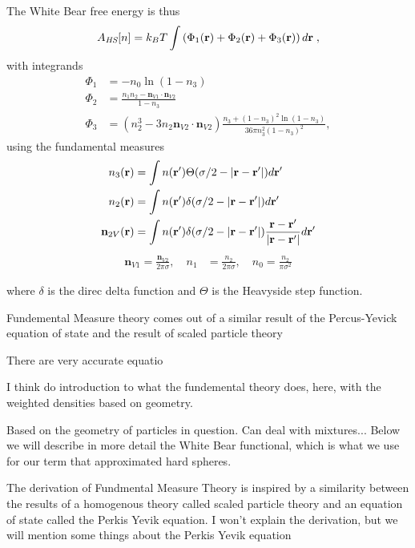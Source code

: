 The White Bear free
energy is thus
\begin{equation}
A_\textit{HS}[n] = k_B T \int \left(\Phi_1(\textbf{r}) + \Phi_2(\textbf{r}) + \Phi_3(\textbf{r})\right) d\textbf{r} \; ,
\end{equation}
with integrands
\begin{align}
\Phi_1 &= -n_0 \ln\left( 1 - n_3\right) \label{eq:Phi1}\\
\Phi_2 &= \frac{n_1 n_2 - \mathbf{n}_{V1} \cdot\mathbf{n}_{V2}}{1-n_3} \\
\Phi_3 &= (n_2^3 - 3 n_2 \mathbf{n}_{V2} \cdot \mathbf{n}_{V2}) \frac{
  n_3 + (1-n_3)^2 \ln(1-n_3)
}{
  36\pi n_3^2\left( 1 - n_3 \right)^2
} , \label{eq:Phi3}
\end{align}
using the fundamental measures
\begin{align}
  n_3(\textbf{r}) &= \int n(\textbf{r}') \Theta(\sigma/2 -\left|\textbf{r} - \textbf{r}'\right|)
  d\textbf{r}' \label{eq:FMn3} \\
  n_2(\textbf{r}) &= \int n(\textbf{r}') \delta(\sigma/2 -\left|\textbf{r} - \textbf{r}'\right|) d\textbf{r}' \\
  \mathbf{n}_{2V}(\textbf{r}) &= \int n(\textbf{r}') \delta(\sigma/2 -\left|\textbf{r} - \textbf{r}'\right|) \frac{\textbf{r}-\textbf{r}'}{|\textbf{r}-\textbf{r}'|}d\textbf{r}'
\end{align}
\begin{align}
  \mathbf{n}_{V1} = \frac{\mathbf{n}_{V2}}{2\pi \sigma}, \quad
  n_1 &= \frac{n_2}{2\pi \sigma} , \quad
  n_0 = \frac{n_2}{\pi \sigma^2} \label{eq:FMrest}
\end{align}

where $\delta$ is the direc delta function and $\Theta$ is the
Heavyside step function.



Fundemental Measure theory comes out of a similar result of the
Percus-Yevick equation of state and the result of scaled particle
theory

There are very accurate equatio

I think do introduction to what the fundemental theory does, here,
with the weighted densities based on geometry.

Based on the geometry of particles in question.  Can deal with
mixtures...  Below we will describe in more detail the White Bear
functional, which is what we use for our term that approximated hard
spheres.

The derivation of Fundmental Measure Theory is inspired by a
similarity between the results of a homogenous theory called scaled
particle theory and an equation of state called the Perkis Yevik
equation.  I won't explain the derivation, but we will mention some
things about the Perkis Yevik equation

